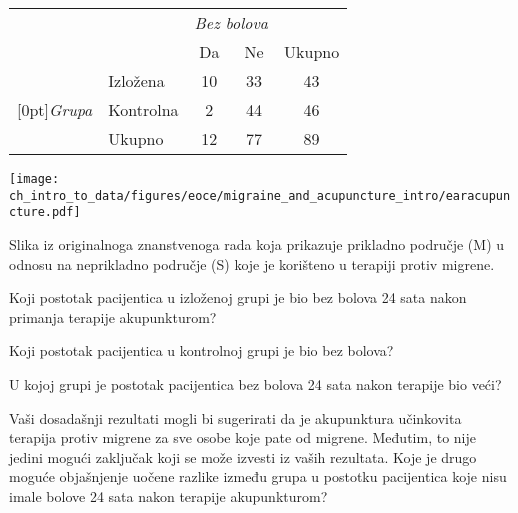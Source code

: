 {\noindent\begin{minipage}[l]{0.4\textwidth}
\begin{tabular}{ll  cc c} 
			                         		&           & \multicolumn{2}{c}{\textit{Bez bolova}} \\
\cline{3-4}
			                        	 	&			& Da 	& Ne 	                  & Ukupno \\
\cline{2-5}
							& Izložena 	& 10	 	& 33		                  & 43 \\
\raisebox{1.5ex}[0pt]{\emph{Grupa}} & Kontrolna	 	& 2	 	& 44 	 	                  & 46 \\
\cline{2-5}
							& Ukupno		& 12		& 77		                  & 89
\end{tabular}
\end{minipage}
\begin{minipage}[c]{0.05\textwidth}
\end{minipage}
\begin{minipage}[c]{0.27\textwidth}
\begin{center}
\texttt{[image: ch\_intro\_to\_data/figures/eoce/migraine\_and\_acupuncture\_intro/earacupuncture.pdf]}
\end{center}
\end{minipage}
\begin{minipage}[c]{0.25\textwidth}
{\footnotesize Slika iz originalnoga znanstvenoga rada koja prikazuje prikladno područje
(M) u odnosu na neprikladno područje (S) koje je korišteno u terapiji protiv migrene.}
\end{minipage}
\begin{parts}
\item Koji postotak pacijentica u izloženoj grupi je bio bez bolova 24 sata nakon primanja terapije akupunkturom? 
\item Koji postotak pacijentica u kontrolnoj grupi je bio bez bolova?
\item U kojoj grupi je postotak pacijentica bez bolova 24 sata nakon terapije bio veći?
\item Vaši dosadašnji rezultati mogli bi sugerirati da je akupunktura učinkovita terapija
protiv migrene za sve osobe koje pate od migrene. Međutim, to nije jedini mogući zaključak
koji se može izvesti iz vaših rezultata. Koje je drugo moguće objašnjenje uočene razlike između grupa u postotku pacijentica koje nisu imale bolove 24 sata nakon terapije akupunkturom?
\end{parts}
}{}


